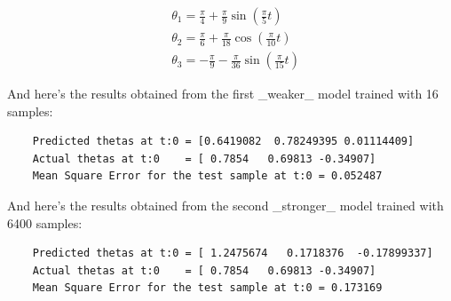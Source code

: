 \documentclass[conference]{IEEEtran}
\begin{document}
\begin{align}
     & \theta_1 = \frac{\pi}{4} + \frac{\pi}{9} \sin\left(\frac{\pi}{5} t\right)     \\
     & \theta_2 = \frac{\pi}{6} + \frac{\pi}{18} \cos\left(\frac{\pi}{10} t\right)   \\
     & \theta_3 = - \frac{\pi}{9} - \frac{\pi}{36} \sin\left(\frac{\pi}{15} t\right)
\end{align}

And here's the results obtained from the first \_weaker\_ model trained with 16 samples:

\begin{mylistingbox}
    \begin{lstlisting}
    Predicted thetas at t:0 = [0.6419082  0.78249395 0.01114409]
    Actual thetas at t:0 	= [ 0.7854   0.69813 -0.34907]
    Mean Square Error for the test sample at t:0 = 0.052487
    \end{lstlisting}
\end{mylistingbox}

And here's the results obtained from the second \_stronger\_ model trained with 6400 samples:

\begin{mylistingbox}
    \begin{lstlisting}
    Predicted thetas at t:0 = [ 1.2475674   0.1718376  -0.17899337]
    Actual thetas at t:0 	= [ 0.7854   0.69813 -0.34907]
    Mean Square Error for the test sample at t:0 = 0.173169
    \end{lstlisting}
\end{mylistingbox}


\end{document}
